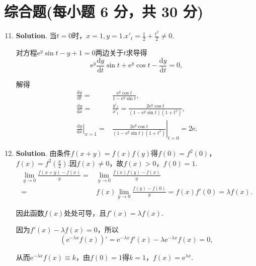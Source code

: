\documentclass[../Main.tex]{subfiles}
\begin{document}
\section{综合题(每小题 6 分，共 30 分)}
\begin{enumerate}
    \setcounter{enumi}{10}
    \item \textbf{Solution}. 当$t=0$时，$x=1,y=1$.$x'_{t}=\frac{1}{2}+\frac{t^{2}}{2}
              \neq0$.

          对方程$\mathrm{e}^{y}\sin t-y+1=0$两边关于$t$求导得
          \[
              \mathrm{e}^{y}\frac{\mathrm{d}y}{\mathrm{d}t}\sin t+\mathrm{e}^{y}\cos t-
              \frac{\mathrm{d}y}{\mathrm{d}t}=0,
          \]

          解得
          \[
              \begin{aligned}
                  \frac{\mathrm{d}y}{\mathrm{d}t}=                    & \frac{\mathrm{e}^y\cos t}{1-\mathrm{e}^y\sin t},                                          \\
                  \frac{\mathrm{d}y}{\mathrm{d}x}=                    & \frac{y'_t}{x'_t}=\frac{2\mathrm{e}^y\cos t}{(1-\mathrm{e}^y\sin t)(1+t^2)},              \\
                  \left.\frac{\mathrm{d}y}{\mathrm{d}x}\right|_{x=1}= & \left.\frac{2\mathrm{e}^y\cos t}{(1-\mathrm{e}^y\sin t)(1+t^2)}\right|_{t=0}=2\mathrm{e}.
              \end{aligned}
          \]

    \item \textbf{Solution}. 由条件$f(x+y)=f(x)f(y)$得$f(0)=f^{2}(0)$，$f(x)
              =f^{2}\left(\frac{x}{2}\right)$.因$f(x)\neq0$，故$f(x)>0$，$f(0)=1$.
          \[
              \begin{aligned}
                  \lim_{y\to0}\frac{f(x+y)-f(x)}{y}= & \lim_{y\to0}\frac{f(x)f(y)-f(x)}{y}                         \\
                  =                                  & f(x)\lim_{y\to0}\frac{f(y)-f(0)}{y}=f(x)f'(0)=\lambda f(x).
              \end{aligned}
          \]

          因此函数$f(x)$处处可导，且$f'(x)=\lambda f(x)$.

          因为$f'(x)-\lambda f(x)=0$，所以
          \[
              (\mathrm{e}^{-\lambda x}f(x))'=\mathrm{e}^{-\lambda x}f'(x)-\lambda \mathrm{e}
              ^{-\lambda x}f(x)=0,
          \]

          从而$\mathrm{e}^{-\lambda x}f(x)\equiv k$，由$f(0)=1$得$k=1$，$f(x)=\mathrm{e}
              ^{\lambda x}$.


\end{enumerate}
\end{document}
